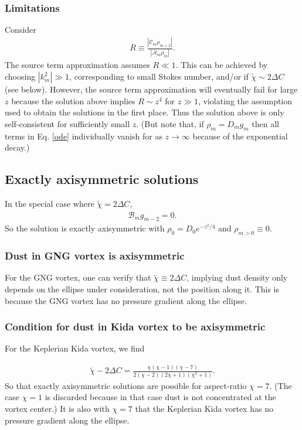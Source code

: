 \documentclass[12pt]{article} %
\begin{document}
\subsubsection{Limitations}
Consider
\begin{align}
R\equiv\frac{|\mathcal{C}_m\rho_{m+2}|}{|\mathcal{A}_m\rho_m|}.
\end{align}
The source term approximation assumes $R\ll 1$. This can be achieved by choosing $|k_m^2|\gg1$, corresponding to small Stokes number, and/or if $\tilde{\chi}\sim2\Delta C$ (see below). However, the source term approximation will eventually fail for large $z$ because the solution above implies $R\sim z^4$ for $z\gg1$, violating the assumption used to obtain the solutions in the first place. Thus the solution above is only self-consistent for sufficiently small $z$.  (But note that, if $\rho_m = D_m g_m$ then all terms in Eq. \ref{ode} individually vanish for as $z\to\infty$ because of the exponential decay.)


\subsection{Exactly axisymmetric solutions}
In the special case where $\tilde{\chi} = 2\Delta C$,
\begin{align}
\mathcal{B}_mg_{m-2} = 0.
\end{align}
So the solution is exactly axisymmetric with $\rho_0 = D_0e^{-z^2/4}$ and $\rho_{m>0} \equiv 0$. 

\subsubsection{Dust in GNG vortex is axisymmetric}
For the GNG vortex, one can verify that $\tilde{\chi}\equiv 2\Delta C$, implying dust density only depends on the ellipse under consideration, not the position along it. This is because the GNG vortex has no pressure gradient along the ellipse. 

\subsubsection{Condition for dust in Kida vortex to be axisymmetric}
For the Keplerian Kida vortex, we find

\begin{align}
\tilde{\chi} - 2\Delta C = \frac{\chi(\chi-1)(\chi-7)}{2(\chi-2)(2\chi+1)(\chi^2+1)}.
\end{align}
So that exactly axisymmetric solutions are possible for aspect-ratio $\chi=7$. (The case $\chi=1$ is discarded because in that case dust is not concentrated at the vortex center.) It is also with $\chi=7$ that the Keplerian Kida vortex has no pressure gradient along the ellipse. 
\end{document}
